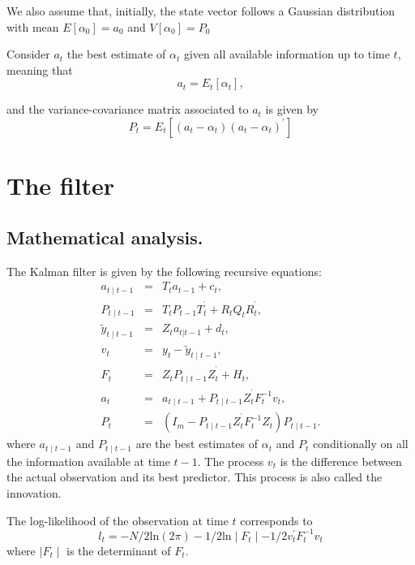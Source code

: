 \documentclass[12pt,a4paper]{article}
\begin{document}
We also assume that, initially, the state vector follows a Gaussian
distribution with mean $E[\alpha _{0}]=a_{0}$ and $V[\alpha _{0}]=P_{0}$

Consider $a_{t}$ the best estimate of $\alpha _{t}$ given all available
information up to time $t$, meaning that%
\begin{equation*}
a_{t}=E_{t}[\alpha _{t}],
\end{equation*}

and the variance-covariance matrix associated to $a_{t}$ is given by%
\begin{equation*}
P_{t}=E_{t}[(a_{t}-\alpha _{t})(a_{t}-\alpha _{t})^{\prime }]
\end{equation*}

\section{The filter}

\subsection{Mathematical analysis.}

The Kalman filter is given by the following recursive equations:%
\begin{eqnarray*}
a_{t\mid t-1} &=&T_{t}a_{t-1}+c_{t}, \\
P_{t\mid t-1} &=&T_{t}P_{t-1}T_{t}^{^{\prime }}+R_{t}Q_{t}R_{t}^{^{\prime }},
\\
\widetilde{y}_{t\mid t-1} &=&Z_{t}a_{t|t-1}+d_{t}, \\
v_{t} &=&y_{t}-\widetilde{y}_{t\mid t-1}, \\
F_{t} &=&Z_{t}P_{t\mid t-1}Z_{t}^{^{\prime }}+H_{t}, \\
a_{t} &=&a_{t\mid t-1}+P_{t\mid t-1}Z_{t}^{^{\prime }}F_{t}^{-1}v_{t}, \\
P_{t} &=&(I_{m}-P_{t\mid t-1}Z_{t}^{^{\prime }}F_{t}^{-1}Z_{t})P_{t\mid t-1}.
\end{eqnarray*}
where $a_{t\mid t-1}$ and $P_{t\mid t-1}$ are the best estimates
of $\alpha
_{t}$ and $P_{t}$ conditionally on all the information available at time $%
t-1 $. The process $v_{t}$ is the difference between the actual observation
and its best predictor. This process is also called the innovation.

The log-likelihood of the observation at time $t$ corresponds to%
\begin{equation*}
l_{t}=-N/2\text{ln}(2\pi )-1/2\text{ln}\mid F_{t}\mid -1/2v_{t}^{\prime
}F_{t}^{-1}v_{t}
\end{equation*}
where $\mid F_{t}\mid $ is the determinant of $F_{t}$.
\end{document}
